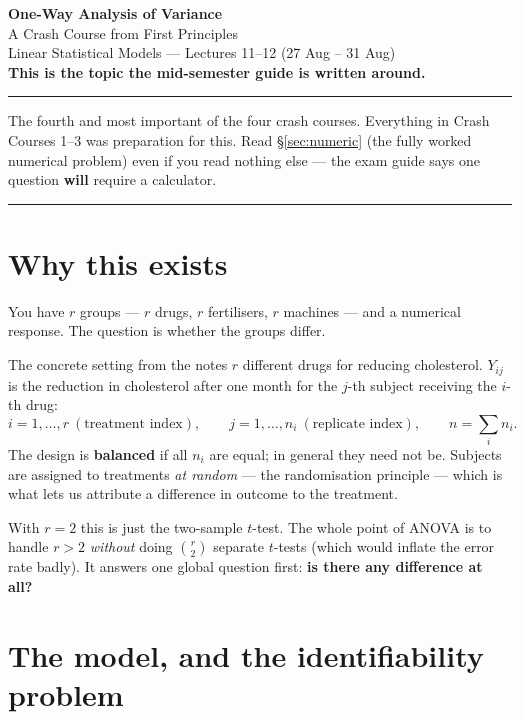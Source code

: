 \documentclass[11pt]{article}
\begin{document}
\begin{center}
{\LARGE\bfseries One-Way Analysis of Variance}\\[4pt]
{\large A Crash Course from First Principles}\\[3pt]
{\small Linear Statistical Models --- Lectures 11--12 (27 Aug -- 31 Aug)}\\[3pt]
{\small\bfseries\color{BrickRed} This is the topic the mid-semester guide is written around.}
\end{center}
\vspace{2pt}\hrule\vspace{10pt}

\noindent The fourth and most important of the four crash courses. Everything in Crash
Courses 1--3 was preparation for this. Read \S\ref{sec:numeric} (the fully worked numerical
problem) even if you read nothing else --- the exam guide says one question \textbf{will}
require a calculator.

\tableofcontents
\vspace{8pt}\hrule\vspace{10pt}

\section{Why this exists}

You have $r$ groups --- $r$ drugs, $r$ fertilisers, $r$ machines --- and a numerical response.
The question is whether the groups differ.

\begin{idea}{The concrete setting from the notes}
$r$ different drugs for reducing cholesterol. $Y_{ij}$ is the reduction in cholesterol after
one month for the $j$-th subject receiving the $i$-th drug:
\[
  i=1,\dots,r \ (\text{treatment index}),\qquad j=1,\dots,n_i\ (\text{replicate index}),
  \qquad n=\sum_i n_i .
\]
The design is \textbf{balanced} if all $n_i$ are equal; in general they need not be.
Subjects are assigned to treatments \emph{at random} --- the randomisation principle --- which
is what lets us attribute a difference in outcome to the treatment.
\end{idea}

With $r=2$ this is just the two-sample $t$-test. The whole point of ANOVA is to handle
$r>2$ \emph{without} doing $\binom{r}{2}$ separate $t$-tests (which would inflate the error
rate badly). It answers one global question first: \textbf{is there any difference at all?}

\section{The model, and the identifiability problem}
\end{document}
